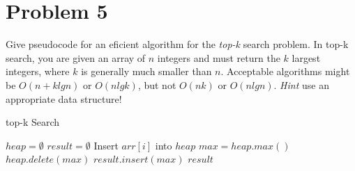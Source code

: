 \documentclass[12pt, letterpaper]{article}
\begin{document}
\break
\section*{Problem 5}

Give pseudocode for an eficient algorithm for the \textit{top-k} search problem.
In top-k search, you are given an array of $n$ integers and must return the $k$
largest integers, where $k$ is generally much smaller than $n$.  Acceptable
algorithms might be $O(n+klgn)$ or $O(nlgk)$, but not $O(nk)$ or $O(nlgn)$.
\textit{Hint} use an appropriate data structure!

\begin{algorithm}
    \caption{top-k Search}
    \begin{minipage}{\textwidth}
        \begin{algorithmic}[1]
            \STATE $heap = \emptyset$
            \STATE $result = \emptyset$
                \STATE Insert $arr[i]$ into $heap$
            \ENDFOR
                \STATE $max = heap.max()$
                \STATE $heap.delete(max)$
                \STATE $result.insert(max)$
            \ENDFOR
            \RETURN $result$
        \end{algorithmic}
    \end{minipage}
\end{algorithm}
\end{document}
